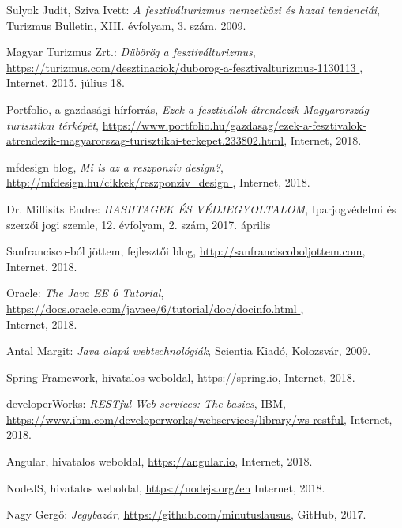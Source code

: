 
\begin{thebibliography}{x}

Sulyok Judit, Sziva Ivett:
\emph{A fesztiválturizmus nemzetközi és hazai tendenciái}, \\
Turizmus Bulletin, XIII. évfolyam, 3. szám, 2009.

Magyar Turizmus Zrt.: \emph{Dübörög a fesztiválturizmus}, \\
\url{ https://turizmus.com/desztinaciok/duborog-a-fesztivalturizmus-1130113 },
Internet, 2015. július 18.

Portfolio, a gazdasági hírforrás, \emph{Ezek a fesztiválok átrendezik Magyarország turisztikai térképét},
\url{https://www.portfolio.hu/gazdasag/ezek-a-fesztivalok-atrendezik-magyarorszag-turisztikai-terkepet.233802.html},
Internet, 2018.

mfdesign blog, \emph{Mi is az a reszponzív design?}, \\
\url{ http://mfdesign.hu/cikkek/reszponziv\_design }, Internet, 2018.

Dr. Millisits Endre: \emph{HASHTAGEK ÉS VÉDJEGYOLTALOM}, Iparjogvédelmi és szerzői jogi szemle, 12. évfolyam, 2. szám, 2017. április

Sanfrancisco-ból jöttem, fejlesztői blog,
\url{http://sanfranciscoboljottem.com},
Internet, 2018.

Oracle: 
\emph{The Java EE 6 Tutorial}, \\
\url{ https://docs.oracle.com/javaee/6/tutorial/doc/docinfo.html }, \\
Internet, 2018.

Antal Margit: \emph{Java alapú webtechnológiák}, Scientia Kiadó, Kolozsvár, 2009.

Spring Framework, hivatalos weboldal,
\url{https://spring.io}, Internet, 2018.

developerWorks: \emph{RESTful Web services: The basics}, IBM,
\url{https://www.ibm.com/developerworks/webservices/library/ws-restful},
Internet, 2018.

Angular, hivatalos weboldal,
\url{https://angular.io}, Internet, 2018.

NodeJS, hivatalos weboldal,
\url{https://nodejs.org/en}
Internet, 2018.

Nagy Gergő: \emph{Jegybazár},
\url{https://github.com/minutuslausus}, GitHub, 2017.


\end{thebibliography}
